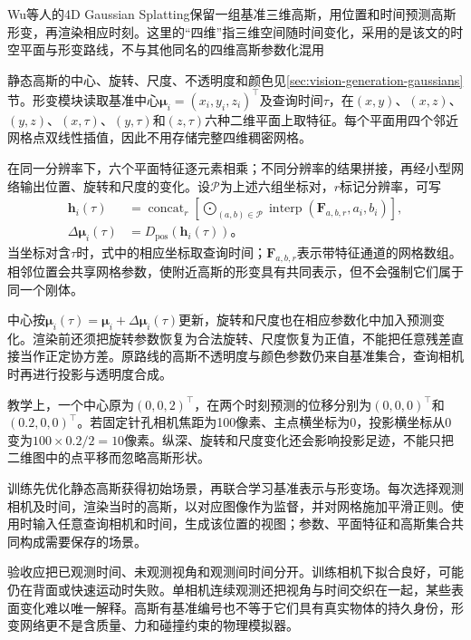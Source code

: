 Wu等人的4D Gaussian Splatting保留一组基准三维高斯，用位置和时间预测高斯形变，再渲染相应时刻。这里的“四维”指三维空间随时间变化，采用的是该文的时空平面与形变路线，不与其他同名的四维高斯参数化混用

静态高斯的中心、旋转、尺度、不透明度和颜色见\ref{sec:vision-generation-gaussians}节。形变模块读取基准中心$\bm\mu_i=(x_i,y_i,z_i)^\top$及查询时间$\tau$，在$(x,y)$、$(x,z)$、$(y,z)$、$(x,\tau)$、$(y,\tau)$和$(z,\tau)$六种二维平面上取特征。每个平面用四个邻近网格点双线性插值，因此不用存储完整四维稠密网格。

在同一分辨率下，六个平面特征逐元素相乘；不同分辨率的结果拼接，再经小型网络输出位置、旋转和尺度的变化。设$\mathcal P$为上述六组坐标对，$r$标记分辨率，可写
\begin{equation}
 \begin{aligned}
 \bm h_i(\tau)
 &=\mathop{\operatorname{concat}}_r
   \left[
    \mathop{\bigodot}_{(a,b)\in\mathcal P}
       \operatorname{interp}
        (\bm F_{a,b,r},a_i,b_i)
   \right],\\
 \Delta\bm\mu_i(\tau)&=D_{\mathrm{pos}}(\bm h_i(\tau))\text{。}
 \end{aligned}
 \label{eq:vision-4d-planes}
\end{equation}
当坐标对含$\tau$时，式中的相应坐标取查询时间；$\bm F_{a,b,r}$表示带特征通道的网格数组。相邻位置会共享网格参数，使附近高斯的形变具有共同表示，但不会强制它们属于同一个刚体。

中心按$\bm\mu_i(\tau)=\bm\mu_i+\Delta\bm\mu_i(\tau)$更新，旋转和尺度也在相应参数化中加入预测变化。渲染前还须把旋转参数恢复为合法旋转、尺度恢复为正值，不能把任意残差直接当作正定协方差。原路线的高斯不透明度与颜色参数仍来自基准集合，查询相机时再进行投影与透明度合成。

教学上，一个中心原为$(0,0,2)^\top$，在两个时刻预测的位移分别为$(0,0,0)^\top$和$(0.2,0,0)^\top$。若固定针孔相机焦距为100像素、主点横坐标为0，投影横坐标从0变为$100\times0.2/2=10$像素。纵深、旋转和尺度变化还会影响投影足迹，不能只把二维图中的点平移而忽略高斯形状。

训练先优化静态高斯获得初始场景，再联合学习基准表示与形变场。每次选择观测相机及时间，渲染当时的高斯，以对应图像作为监督，并对网格施加平滑正则。使用时输入任意查询相机和时间，生成该位置的视图；参数、平面特征和高斯集合共同构成需要保存的场景。

验收应把已观测时间、未观测视角和观测间时间分开。训练相机下拟合良好，可能仍在背面或快速运动时失败。单相机连续观测还把视角与时间交织在一起，某些表面变化难以唯一解释。高斯有基准编号也不等于它们具有真实物体的持久身份，形变网络更不是含质量、力和碰撞约束的物理模拟器。

